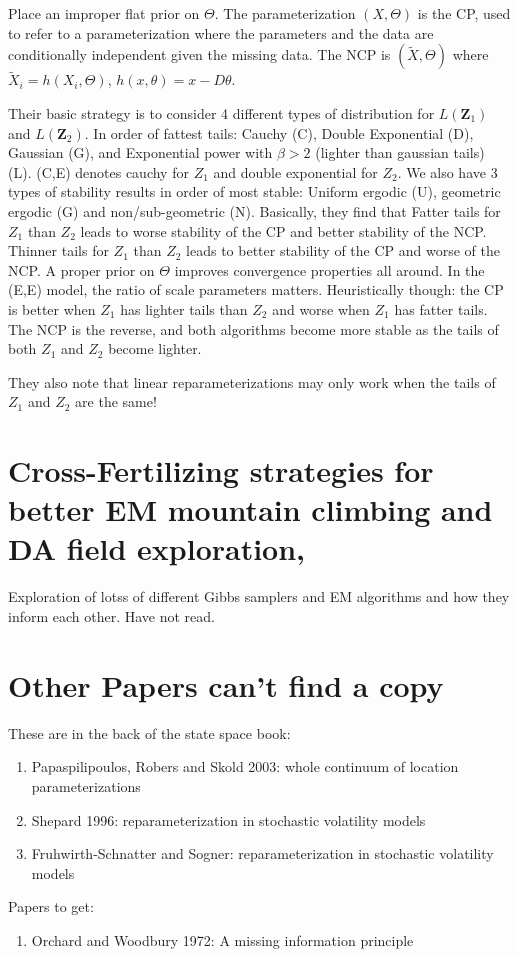 \documentclass{article}\usepackage[]{graphicx}\usepackage[]{color}
\begin{document}
Place an improper flat prior on $\Theta$. The parameterization $(X,\Theta)$ is the CP, used to refer to a parameterization where the parameters and the data are conditionally independent given the missing data. The NCP is $(\tilde{X},\Theta)$ where $\tilde{X}_i=h(X_i,\Theta)$, $h(x,\theta)=x - D\theta$. 

Their basic strategy is to consider 4 different types of distribution for $L(\bm{Z}_1)$ and $L(\bm{Z}_2)$. In order of fattest tails: Cauchy (C), Double Exponential (D), Gaussian (G), and Exponential power with $\beta>2$ (lighter than gaussian tails) (L). (C,E) denotes cauchy for $Z_1$ and double exponential for $Z_2$. We also have 3 types of stability results in order of most stable: Uniform ergodic (U), geometric ergodic (G) and non/sub-geometric (N). Basically, they find that Fatter tails for $Z_1$ than $Z_2$  leads to worse stability of the CP and better stability of the NCP. Thinner tails for $Z_1$ than $Z_2$ leads to better stability of the CP and worse of the NCP. A proper prior on $\Theta$ improves convergence properties all around. In the (E,E) model, the ratio of scale parameters matters. Heuristically though: the CP is better when $Z_1$ has lighter tails than $Z_2$ and worse when $Z_1$ has fatter tails. The NCP is the reverse, and both algorithms become more stable as the tails of both $Z_1$ and $Z_2$ become lighter.

They also note that linear reparameterizations may only work when the tails of $Z_1$ and $Z_2$ are the same!

\section{Cross-Fertilizing strategies for better EM mountain climbing and DA field exploration, \citet{van2010cross}}
Exploration of lotss of different Gibbs samplers and EM algorithms and how they inform each other. Have not read.
\section{Other Papers can't find a copy}
These are in the back of the state space book:
\begin{enumerate}
\item Papaspilipoulos, Robers and Skold 2003: whole continuum of location parameterizations
\item Shepard 1996: reparameterization in stochastic volatility models
\item Fruhwirth-Schnatter and Sogner: reparameterization in stochastic volatility models
\end{enumerate}
Papers to get:
\begin{enumerate}
\item Orchard and Woodbury 1972: A missing information principle
\end{enumerate}

\clearpage



\end{document}
